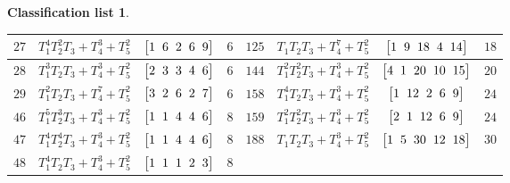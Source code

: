 \documentclass[10pt,a4paper]{amsart}
\theoremstyle{definition}
\newtheorem{class-list}[thm]{Classification list}
\numberwithin{equation}{section}
\begin{document}
\begin{class-list}
\begin{table}[h!]
\begin{tabu}{c|c|c|c||c|c|c|c}
\\ \hline
${27}$&${T_{1}^{4}T_{2}^{2}T_{3}+T_{4}^{3}+T_{5}^{2}}$
&$\arraycolsep=1mm\begin{bmatrix}{1} & {6} & {2} & {6} & {9}\end{bmatrix}$&${6}$
&${125}$&${T_{1}T_{2}T_{3}+T_{4}^{7}+T_{5}^{2}}$
&$\arraycolsep=1mm\begin{bmatrix}{1} & {9} & {18} & {4} & {14}\end{bmatrix}$&${18}$
\\ \hline
${28}$&${T_{1}^{3}T_{2}T_{3}+T_{4}^{3}+T_{5}^{2}}$
&$\arraycolsep=1mm\begin{bmatrix}{2} & {3} & {3} & {4} & {6}\end{bmatrix}$&${6}$
&${144}$&${T_{1}^{2}T_{2}^{2}T_{3}+T_{4}^{3}+T_{5}^{2}}$
&$\arraycolsep=1mm\begin{bmatrix}{4} & {1} & {20} & {10} & {15}\end{bmatrix}$&${20}$
\\ \hline
${29}$&${T_{1}^{2}T_{2}T_{3}+T_{4}^{7}+T_{5}^{2}}$
&$\arraycolsep=1mm\begin{bmatrix}{3} & {2} & {6} & {2} & {7}\end{bmatrix}$&${6}$
&${158}$&${T_{1}^{4}T_{2}T_{3}+T_{4}^{3}+T_{5}^{2}}$
&$\arraycolsep=1mm\begin{bmatrix}{1} & {12} & {2} & {6} & {9}\end{bmatrix}$&${24}$
\\ \hline
${46}$&${T_{1}^{5}T_{2}^{3}T_{3}+T_{4}^{3}+T_{5}^{2}}$
&$\arraycolsep=1mm\begin{bmatrix}{1} & {1} & {4} & {4} & {6}\end{bmatrix}$&${8}$
&${159}$&${T_{1}^{2}T_{2}^{2}T_{3}+T_{4}^{3}+T_{5}^{2}}$
&$\arraycolsep=1mm\begin{bmatrix}{2} & {1} & {12} & {6} & {9}\end{bmatrix}$&${24}$
\\ \hline
${47}$&${T_{1}^{4}T_{2}^{4}T_{3}+T_{4}^{3}+T_{5}^{2}}$
&$\arraycolsep=1mm\begin{bmatrix}{1} & {1} & {4} & {4} & {6}\end{bmatrix}$&${8}$
&${188}$&${T_{1}T_{2}T_{3}+T_{4}^{3}+T_{5}^{2}}$
&$\arraycolsep=1mm\begin{bmatrix}{1} & {5} & {30} & {12} & {18}\end{bmatrix}$&${30}$
\\
\hline
${48}$&${T_{1}^{4}T_{2}T_{3}+T_{4}^{3}+T_{5}^{2}}$
&$\arraycolsep=1mm\begin{bmatrix}{1} & {1} & {1} & {2} & {3}\end{bmatrix}$&${8}$

\end{tabu}
\end{table}
\end{class-list}
\end{document}
